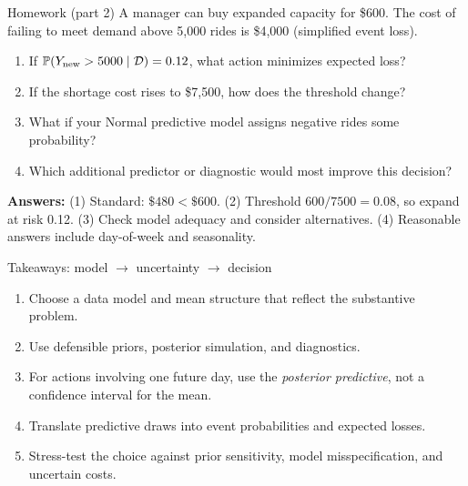 \documentclass[aspectratio=43,11pt]{beamer}
\newcommand{\Prob}{\mathbb{P}}
\newcommand{\dd}{\mathcal D}
\begin{document}
\begin{frame}{Homework (part 2)}
A manager can buy expanded capacity for \$600. The cost of failing to meet demand above 5,000 rides is \$4,000 (simplified event loss).
\begin{enumerate}
\item If $\Prob(Y_{\rm new}>5000\mid\dd)=0.12$, what action minimizes expected loss?
\item If the shortage cost rises to \$7,500, how does the threshold change?
\item What if your Normal predictive model assigns negative rides some probability?
\item Which additional predictor or diagnostic would most improve this decision?
\end{enumerate}
\par\medskip
\scriptsize \textbf{Answers:} (1) Standard: $\$480<\$600$. (2) Threshold $600/7500=0.08$, so expand at risk 0.12. (3) Check model adequacy and consider alternatives. (4) Reasonable answers include day-of-week and seasonality.
\end{frame}

\begin{frame}{Takeaways: model $\rightarrow$ uncertainty $\rightarrow$ decision}
\begin{enumerate}
\item Choose a data model and mean structure that reflect the substantive problem.
\item Use defensible priors, posterior simulation, and diagnostics.
\item For actions involving one future day, use the \emph{posterior predictive}, not a confidence interval for the mean.
\item Translate predictive draws into event probabilities and expected losses.
\item Stress-test the choice against prior sensitivity, model misspecification, and uncertain costs.
\end{enumerate}
\end{frame}
\end{document}
